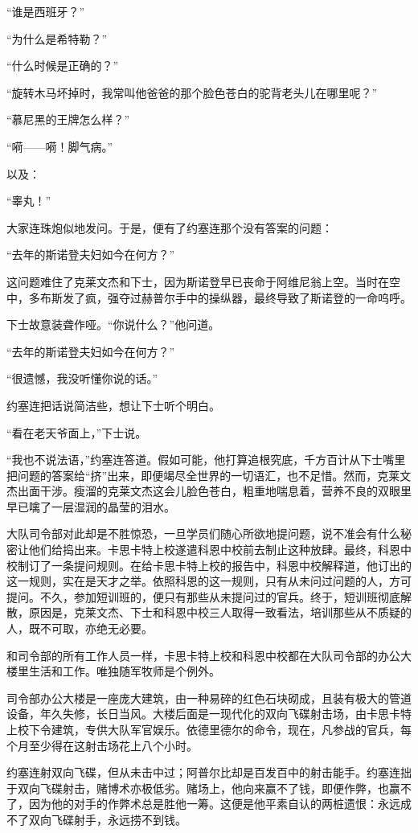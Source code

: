     “谁是西班牙？”

    “为什么是希特勒？”

    “什么时候是正确的？”

    “旋转木马坏掉时，我常叫他爸爸的那个脸色苍白的驼背老头儿在哪里呢？”

    “慕尼黑的王牌怎么样？”

    “嗬——嗬！脚气病。”

    以及：

    “睾丸！”

    大家连珠炮似地发问。于是，便有了约塞连那个没有答案的问题：

    “去年的斯诺登夫妇如今在何方？”

    这问题难住了克莱文杰和下士，因为斯诺登早已丧命于阿维尼翁上空。当时在空中，多布斯发了疯，强夺过赫普尔手中的操纵器，最终导致了斯诺登的一命呜呼。

    下士故意装聋作哑。“你说什么？”他问道。

    “去年的斯诺登夫妇如今在何方？”

    “很遗憾，我没听懂你说的话。”

    约塞连把话说简洁些，想让下士听个明白。

    “看在老天爷面上，”下士说。

    “我也不说法语，”约塞连答道。假如可能，他打算追根究底，千方百计从下士嘴里把问题的答案给“挤”出来，即便竭尽全世界的一切语汇，也不足惜。然而，克莱文杰出面干涉。瘦溜的克莱文杰这会儿脸色苍白，粗重地喘息着，营养不良的双眼里早已噙了一层湿润的晶莹的泪水。

    大队司令部对此却是不胜惊恐，一旦学员们随心所欲地提问题，说不准会有什么秘密让他们给捣出来。卡思卡特上校遂遣科恩中校前去制止这种放肆。最终，科恩中校制订了一条提问规则。在给卡思卡特上校的报告中，科恩中校解释道，他订出的这一规则，实在是天才之举。依照科恩的这一规则，只有从未问过问题的人，方可提问。不久，参加短训班的，便只有那些从未提问过的官兵。终于，短训班彻底解散，原因是，克莱文杰、下士和科恩中校三人取得一致看法，培训那些从不质疑的人，既不可取，亦绝无必要。
 


    和司令部的所有工作人员一样，卡思卡特上校和科恩中校都在大队司令部的办公大楼里生活和工作。唯独随军牧师是个例外。

    司令部办公大楼是一座庞大建筑，由一种易碎的红色石块砌成，且装有极大的管道设备，年久失修，长日当风。大楼后面是一现代化的双向飞碟射击场，由卡思卡特上校下令建筑，专供大队军官娱乐。依德里德尔的命令，现在，凡参战的官兵，每个月至少得在这射击场花上八个小时。

    约塞连射双向飞碟，但从未击中过；阿普尔比却是百发百中的射击能手。约塞连拙于双向飞碟射击，赌博术亦极低劣。赌场上，他向来赢不了钱，即便作弊，也赢不了，因为他的对手的作弊术总是胜他一筹。这便是他平素自认的两桩遗恨：永远成不了双向飞碟射手，永远捞不到钱。

